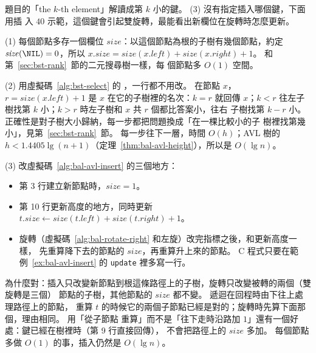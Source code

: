 題目的「the $k$-th element」解讀成第 $k$ 小的鍵。 (3) 沒有指定插入哪個鍵，下面用插
入 $40$ 示範，這個鍵會引起雙旋轉，最能看出新欄位在旋轉時怎麼更新。

(1) 每個節點多存一個欄位 $\mathit{size}$：以這個節點為根的子樹有幾個節點，約定
$\mathit{size}(\NIL) = 0$，所以 $x.\mathit{size} = \mathit{size}(x.\mathit{left}) +
\mathit{size}(x.\mathit{right}) + 1$。 和第~\ref{sec:bst-rank}~節的二元搜尋樹一樣，每
個節點多 $O(1)$ 空間。

(2) 用虛擬碼~\ref{alg:bst-select} 的 ，一行都不用改。 在節點 $x$，
$r = \mathit{size}(x.\mathit{left}) + 1$ 是 $x$ 在它的子樹裡的名次：$k = r$ 就回傳
$x$；$k < r$ 往左子樹找第 $k$ 小；$k > r$ 時左子樹和 $x$ 共 $r$ 個都比答案小，往右
子樹找第 $k - r$ 小。 正確性是對子樹大小歸納，每一步都把問題換成「在一棵比較小的子
樹裡找第幾小」，見第~\ref{sec:bst-rank}~節。 每一步往下一層，時間 $O(h)$；AVL 樹的
$h < 1.4405 \lg(n+1)$（定理~\ref{thm:bal-avl-height}），所以是 $O(\lg n)$。

(3) 改虛擬碼~\ref{alg:bal-avl-insert} 的三個地方：
\begin{itemize}
\item 第 3 行建立新節點時，$\mathit{size} = 1$。
\item 第 10 行更新高度的地方，同時更新
$t.\mathit{size} \gets \mathit{size}(t.\mathit{left}) + \mathit{size}(t.\mathit{right}) + 1$。
\item 旋轉（虛擬碼~\ref{alg:bal-rotate-right} 和左旋）改完指標之後，和更新高度一樣，
先重算降下去的節點的 $\mathit{size}$，再重算升上來的節點。 C 程式只要在範例~\ref{ex:bal-avl-insert}
的 \texttt{update} 裡多寫一行。
\end{itemize}
為什麼對：插入只改變新節點到根這條路徑上的子樹，旋轉只改變被轉的兩個（雙旋轉是三個）
節點的子樹，其他節點的 $\mathit{size}$ 都不變。 遞迴在回程時由下往上處理路徑上的節點，
重算 $t$ 的時候它的兩個子節點已經是對的；旋轉時先算下面那個，理由相同。 用「從子節點
重算」而不是「往下走時沿路加 $1$」還有一個好處：鍵已經在樹裡時（第 9 行直接回傳），
不會把路徑上的 $\mathit{size}$ 多加。 每個節點多做 $O(1)$ 的事，插入仍然是 $O(\lg n)$。

